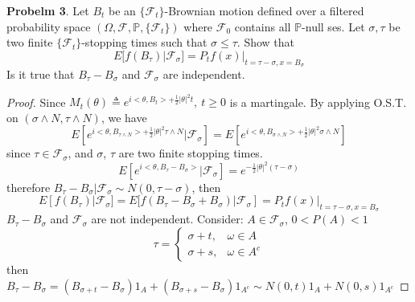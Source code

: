 \documentclass{article}     %
\begin{document}
\noindent
\textbf{Probelm 3}. Let $B_t$ be an $\{\mathcal{F}_t\}$-Brownian motion defined over a filtered probability space $(\Omega,\mathcal{F},\mathbb{P},\{\mathcal{F}_t\})$ where $\mathcal{F}_0$ contains all $\mathbb{P}$-null ses. Let $\sigma,\tau$ be two finite $\{\mathcal{F}_t\}$-stopping times such that $\sigma\leq \tau$. Show that 
\[E[f(B_{\tau})|\mathcal{F}_{\sigma}]=P_tf(x)|_{t=\tau-\sigma, x=B_{\sigma}}\]
Is it true that $B_{\tau}-B_{\sigma}$ and $\mathcal{F}_{\sigma}$ are independent.
\begin{proof}
Since $M_t(\theta)\triangleq e^{i<\theta,B_t>+\frac{1}{2}|\theta|^2t}, ~t\geq 0$ is a martingale. By applying O.S.T. on $(\sigma \wedge N, \tau \wedge N)$, we have 
\[E[e^{i<\theta,B_{\tau \wedge N}>+\frac{1}{2}|\theta|^2\tau \wedge N}|\mathcal{F}_{\sigma}] = E [  e^{i<\theta,B_{\sigma \wedge N}> +\frac{1}{2}|\theta|^2 \sigma \wedge N}]\]
since $\tau \in \mathcal{F}_{\sigma}$, and $\sigma$, $\tau$ are two finite stopping times.
\[E[e^{i<\theta, B_{\tau}-B_{\sigma}>}|\mathcal{F}_{\sigma}]=e^{ -\frac{1}{2} |\theta|^2 (\tau-\sigma) } \]
therefore $B_{\tau}-B_{\sigma}|\mathcal{F}_{\sigma}\sim N(0,\tau-\sigma)$, then 
\[E[f(B_{\tau})|\mathcal{F}_{\sigma}]=E[f(B_{\tau}-B_{\sigma}+B_{\sigma})|\mathcal{F}_{\sigma}]=P_t f(x)|_{t=\tau-\sigma,x=B_{\sigma}}\]
$B_{\tau}-B_{\sigma}$ and $\mathcal{F}_{\sigma}$ are not independent. Consider: $A\in \mathcal{F}_{\sigma}$, $0<P(A)<1$
\[\tau=\begin{cases}
 \sigma+t, &\omega\in A \\
 \sigma+s , & \omega \in A^c
 \end{cases}\]
 then $B_{\tau}-B_{\sigma}=(B_{\sigma+t}-B_{\sigma})1_A+(B_{\sigma+s}-B_{\sigma})1_{A^c}\sim N(0,t)1_A+N(0,s)1_{A^c}$
\end{proof}
\end{document}
